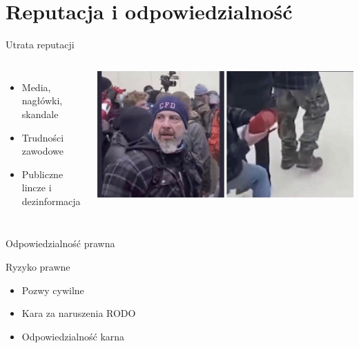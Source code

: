 \section{Reputacja i odpowiedzialność}
\begin{frame}{Utrata reputacji}
\begin{columns}[c]
    \begin{itemize}
      \item Media, nagłówki, skandale
      \item Trudności zawodowe
      \item Publiczne lincze i dezinformacja
    \end{itemize}
    \includegraphics[width=1\textwidth]{images/david.jpg}
\end{columns}
\end{frame}

\begin{frame}{Odpowiedzialność prawna}
    \begin{block}{Ryzyko prawne}
        \begin{itemize}
        \item Pozwy cywilne
        \item Kara za naruszenia RODO
        \item Odpowiedzialność karna \cite{zagrozeniaLudzie}
        \end{itemize}
    \end{block}
\end{frame}